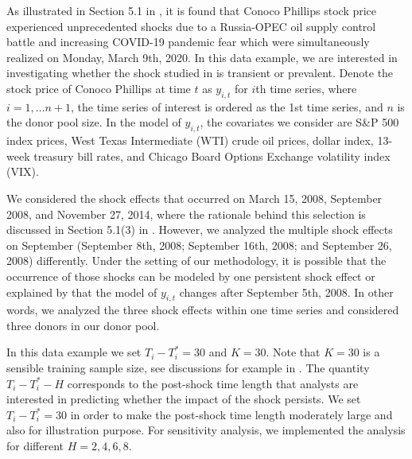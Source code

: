 \documentclass[11pt]{article}
\theoremstyle{definition}
\begin{document}
\label{sptcop}



As illustrated in Section 5.1 in \cite{lin2021minimizing}, it is found that Conoco Phillips stock price experienced unprecedented shocks due to a Russia-OPEC oil supply control battle and increasing COVID-19 pandemic fear which were simultaneously realized on Monday, March 9th, 2020. In this data example, we are interested in investigating whether the shock studied in \cite{lin2021minimizing} is transient or prevalent. Denote the stock price of Conoco Phillips at time $t$ as $y_{i,t}$ for $i$th time series, where $i = 1, \ldots n+1$, the time series of interest is ordered as the 1st time series, and $n$ is the donor pool size. In the model of $y_{i,t}$, the covariates we consider are S\&P 500 index prices, West Texas Intermediate (WTI) crude oil prices, dollar index, 13-week treasury bill rates, and Chicago Board Options Exchange volatility index (VIX). 

We considered the shock effects that occurred on March 15, 2008, September 2008, and November 27, 2014, where the rationale behind this selection is discussed in Section 5.1(3) in  \cite{lin2021minimizing}. However, we analyzed the multiple shock effects on September (September 8th, 2008; September 16th, 2008; and September 26, 2008) differently. Under the  setting of our methodology, it is possible that the occurrence of  those shocks can be modeled by one persistent shock effect or explained by that the model of $y_{i,t}$ changes after September 5th, 2008. In other words, we analyzed the three shock effects within one time series and considered three donors in our donor pool. 

In this data example we set $T_i- T_i^* = 30$ and $K = 30$. Note that $K = 30$ is a sensible  training sample size, see discussions for example in  \cite{lin2021minimizing}. The quantity $T_i-T_i^*-H$ corresponds to the post-shock time length that analysts are interested in predicting whether the impact of the shock persists.  We set $T_i- T_i^* = 30$  in order to make the post-shock time length moderately large and also for illustration purpose. For sensitivity analysis, we implemented the analysis for different  $H= 2, 4, 6, 8$.
\end{document}
